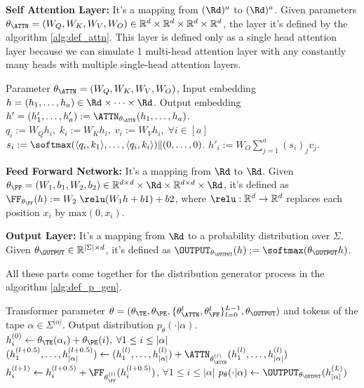 \textbf{Self Attention Layer: } It's a mapping from $(\Rd)^a$ to $(\Rd)^a$. Given parameters $\theta_{\ATTN} = (W_Q, W_K , W_V , W_O) \in \mathbb{R}^d \times \mathbb{R}^d \times \mathbb{R}^d \times \mathbb{R}^d$, the layer it's defined by the algorithm \ref{alg:def_attn}. This layer is defined only as a single head attention layer because we can simulate 1 multi-head attention layer with any constantly many heads with multiple single-head attention layers. 

\begin{algorithm}
\caption{Causal Self-Attention, $\ATTN$}\label{alg:def_attn}
\begin{algorithmic}[1]
\Require  Parameter $\theta_\ATTN = (W_Q,W_K,W_V,W_O)$, Input embedding $h= (h_1,\ldots, h_a)\in\Rd \times \dots \times \Rd$.
\Ensure Output embedding $h'= (h'_1,\ldots, h'_a) := \ATTN_{\theta_\ATTN}(h_1,\ldots, h_a)$.
\State $q_i := W_Q  h_i, \; k_i := W_K h_i, \; v_i := W_V h_i, \; \forall i\in[a]$
\State $s_i := \softmax (\langle q_i, k_1 \rangle, \ldots, \langle q_i, k_i\rangle) \| (0,\ldots, 0) $. 
\State $h'_i := W_O \sum_{j=1}^a (s_i)_j v_j$.
\end{algorithmic}
\end{algorithm}

\textbf{Feed Forward Network: } It's a mapping from $\Rd$ to $\Rd$. Given $\theta_{\FF} = (W_1 , b_1 , W_2 , b_2) \in \mathbb{R}^{d \times d} \times \Rd \times \mathbb{R}^{d \times d} \times \Rd$, it's defined as $\FF_{\theta_\FF}(h) := W_2 \; \relu(W_1 h + b1 ) + b2$, where $\relu: \mathbb{R}^d \to \mathbb{R}^d$ replaces each position $x_i$ by $\text{max}(0, x_i)$.

\textbf{Output Layer: } It's a mapping from $\Rd$ to a probability distribution over $\Sigma$. Given $\theta_{\OUTPUT} \in \mathbb{R}^{| \Sigma | \times d}$, it's defined as $\OUTPUT_{\theta_\OUTPUT}(h) := \softmax(\theta_\OUTPUT h)$.


All these parts come together for the distribution generator process in the algorithm \ref{alg:def_p_gen}.

\begin{algorithm}
\caption{Distribution generator}\label{alg:def_p_gen}
\begin{algorithmic}[1]
\Require   Transformer parameter $\theta = (\theta_\TE, \theta_\PE, \{\theta_\ATTN^{l}, \theta_\FF^{l}\}_{l=0}^{L-1}, \theta_\OUTPUT)$ and tokens of the tape $\alpha \in \Sigma^{|\alpha|}$.
\Ensure Output distribution $p_\theta(\cdot | \alpha)$.
\State $h^{(0)}_i \gets \theta_\TE(\alpha_i) + \theta_\PE(i), \; \forall 1 \leq i \leq |\alpha|$
\State	$( h^{(l+0.5)}_1,\ldots, h^{(l+0.5)}_{|\alpha|}) \gets (h^{(l)}_1,\ldots, h^{(l)}_{|\alpha|}) +\ATTN_{\theta^{(l)}_\ATTN}(h^{(l)}_1,\ldots, h^{(l)}_{|\alpha|}) $
\State  $ h^{(l+1)}_i \gets  h^{(l+0.5)}_i + \FF_{\theta^{(l)}_\FF}(h^{(l+0.5)}_i)$, $\forall 1 \leq i \leq |\alpha|$
\EndFor
\State $p_\theta(\cdot| \alpha) \gets  \OUTPUT_{\theta_\OUTPUT}(h^{(L)}_{|\alpha|})$
\end{algorithmic}
\end{algorithm}


